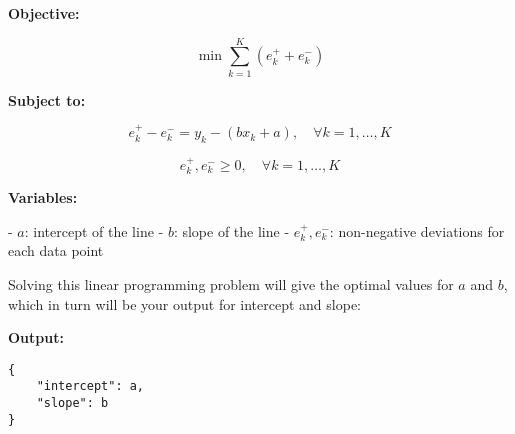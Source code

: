 \documentclass{article}
\begin{document}
\textbf{Objective:}

\[
\min \sum_{k=1}^{K} (e_k^+ + e_k^-)
\]

\textbf{Subject to:}

\[
e_k^+ - e_k^- = y_k - (bx_k + a), \quad \forall k = 1, \ldots, K
\]

\[
e_k^+, e_k^- \geq 0, \quad \forall k = 1, \ldots, K
\]

\textbf{Variables:}

- \(a\): intercept of the line
- \(b\): slope of the line
- \(e_k^+, e_k^-\): non-negative deviations for each data point

Solving this linear programming problem will give the optimal values for \(a\) and \(b\), which in turn will be your output for intercept and slope:

\textbf{Output:}

\begin{verbatim}
{
    "intercept": a,
    "slope": b
}
\end{verbatim}
\end{document}
